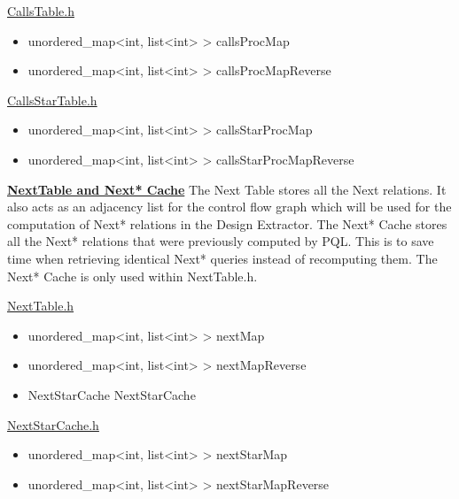 \documentclass[12pt]{article}
\begin{document}
{{{{{{{{\underline{CallsTable.h}
\begin{itemize}
\item unordered\_map<int, list<int> > callsProcMap
\item unordered\_map<int, list<int> > callsProcMapReverse
\end{itemize}
{\underline{CallsStarTable.h}
\begin{itemize}
\item unordered\_map<int, list<int> > callsStarProcMap
\item unordered\_map<int, list<int> > callsStarProcMapReverse
\end{itemize}
\textbf{\underline{NextTable and Next* Cache}}
\newline The Next Table stores all the Next relations. It also acts as an adjacency list for the control flow graph which will be used for the computation of Next* relations in the Design Extractor. The Next* Cache stores all the Next* relations that were previously computed by PQL. This is to save time when retrieving identical Next* queries instead of recomputing them. The Next* Cache is only used within NextTable.h.
\newline
{\underline{NextTable.h}
\begin{itemize}
\item unordered\_map<int, list<int> > nextMap
\item unordered\_map<int, list<int> > nextMapReverse
\item NextStarCache NextStarCache
\end{itemize}
{\underline{NextStarCache.h}
\begin{itemize}
\item unordered\_map<int, list<int> > nextStarMap
\item unordered\_map<int, list<int> > nextStarMapReverse
\end{itemize}
}}}}}}}}}}}
\end{document}
